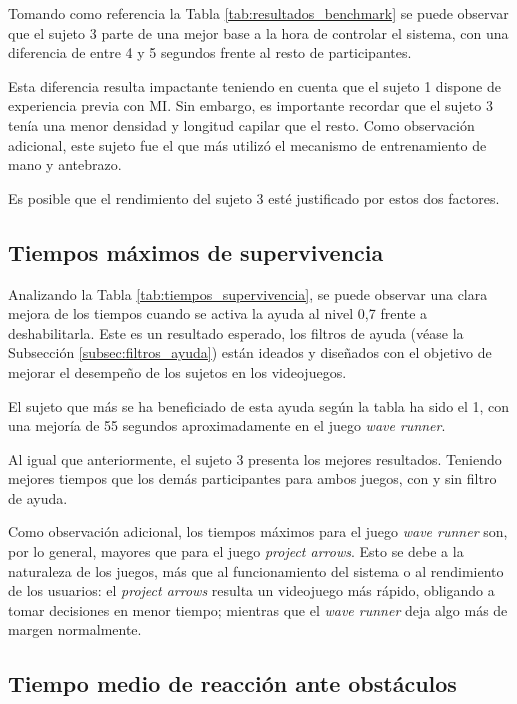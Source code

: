 Tomando como referencia la Tabla \ref{tab:resultados_benchmark} se puede
observar que el sujeto 3 parte de una mejor base a la hora de controlar el
sistema, con una diferencia de entre 4 y 5 segundos frente al resto de
participantes.

Esta diferencia resulta impactante teniendo en cuenta que el sujeto 1 dispone
de experiencia previa con MI. Sin embargo, es importante recordar que el sujeto
3 tenía una menor densidad y longitud capilar que el resto. Como observación
adicional, este sujeto fue el que más utilizó el mecanismo de entrenamiento de
mano y antebrazo.

Es posible que el rendimiento del sujeto 3 esté justificado por estos dos
factores.

\subsection{Tiempos máximos de supervivencia}
\label{subsec:rt_analisis_tiempos_maximos}

Analizando la Tabla \ref{tab:tiempos_supervivencia}, se puede observar una
clara mejora de los tiempos cuando se activa la ayuda al nivel 0,7 frente a
deshabilitarla. Este es un resultado esperado, los filtros de ayuda (véase la
Subsección \ref{subsec:filtros_ayuda}) están ideados y diseñados con el
objetivo de mejorar el desempeño de los sujetos en los videojuegos.

El sujeto que más se ha beneficiado de esta ayuda según la tabla ha sido el 1,
con una mejoría de 55 segundos aproximadamente en el juego \textit{wave
      runner}.

Al igual que anteriormente, el sujeto 3 presenta los mejores resultados.
Teniendo mejores tiempos que los demás participantes para ambos juegos, con y
sin filtro de ayuda.

Como observación adicional, los tiempos máximos para el juego \textit{wave
      runner} son, por lo general, mayores que para el juego \textit{project arrows}.
Esto se debe a la naturaleza de los juegos, más que al funcionamiento del
sistema o al rendimiento de los usuarios: el \textit{project arrows} resulta un
videojuego más rápido, obligando a tomar decisiones en menor tiempo; mientras
que el \textit{wave runner} deja algo más de margen normalmente.

\subsection{Tiempo medio de reacción ante obstáculos}
\label{subsec:rt_analisis_tiempos_maximos}

